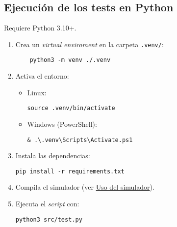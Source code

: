 \subsection*{Ejecución de los tests en Python}
Requiere Python 3.10+.
\begin{enumerate}
  \item Crea un \textit{virtual enviroment} en la carpeta \texttt{.venv/}:
  \begin{verbatim}
    python3 -m venv ./.venv
  \end{verbatim}
  \item Activa el entorno:
  \begin{itemize}
    \item Linux:
    \begin{verbatim}
source .venv/bin/activate
    \end{verbatim}
    \item Windows (PowerShell):
    \begin{verbatim}
& .\.venv\Scripts\Activate.ps1
    \end{verbatim}
  \end{itemize}
  \item Instala las dependencias:
  \begin{verbatim}
pip install -r requirements.txt
  \end{verbatim}
  \item Compila el simulador (ver \href{sec:compilation}{Uso del simulador}).
  \item Ejecuta el \textit{script} con:
  \begin{verbatim}
python3 src/test.py
  \end{verbatim}
\end{enumerate}

